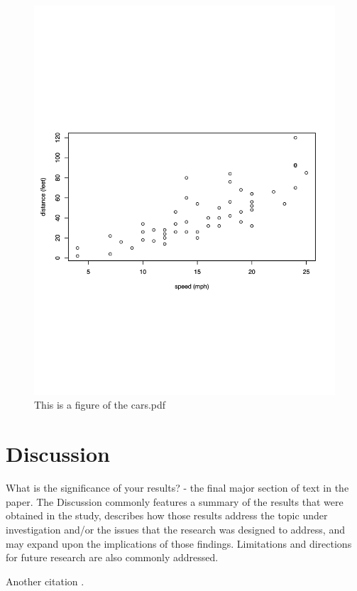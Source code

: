 \documentclass[12pt]{article}
\begin{document}
\begin{figure}
  \centering
  \includegraphics[width=\textwidth]{cars.pdf}
  \caption{This is a figure of the cars.pdf}
  \label{fig:cars}
\end{figure}

\section{Discussion}
What is the significance of your results? - the final major section of text in the paper.  The Discussion commonly features a summary of the results that were obtained in the study, describes how those results address the topic under investigation and/or the issues that the research was designed to address, and may expand upon the implications of those findings.  Limitations and directions for future research are also commonly addressed.

Another citation \citep{srinath2017python}.



\end{document}
